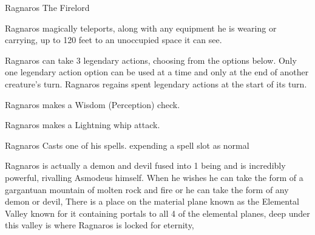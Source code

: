 \begin{monsterbox}{Ragnaros The Firelord}
\begin{monsteraction}[Polymorph]
	\end{monsteraction}	
	\begin{monsteraction}[Teleport]
		Ragnaros magically teleports, along with any equipment he is wearing or carrying, up to 120 feet to an unoccupied space it can see.
	\end{monsteraction}	
	Ragnaros can take 3 legendary actions, choosing from the options below. Only one legendary action option can be used at a time and only at the end of another creature's turn. Ragnaros regains spent legendary actions at the start of its turn.
	\begin{monsteraction}[Detect]
		Ragnaros makes a Wisdom (Perception) check.
	\end{monsteraction}
	\begin{monsteraction}
		Ragnaros makes a Lightning whip attack.
	\end{monsteraction}
	\begin{monsteraction}
		Ragnaros Casts one of his spells. expending a spell slot as normal
	\end{monsteraction}
	Ragnaros is actually a demon and devil fused into 1 being and is incredibly powerful, rivalling Asmodeus himself. When he wishes he can take the form of a gargantuan mountain of molten rock and fire or he can take the form of any demon or devil, There is a place on the material plane known as the Elemental Valley known for it containing portals to all 4 of the elemental planes, deep under this valley is where Ragnaros is locked for eternity,
\end{monsterbox}

